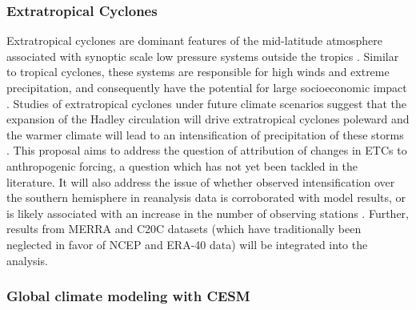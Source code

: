 \documentclass[11pt]{article}
\begin{document}


\subsubsection{Extratropical Cyclones}

Extratropical cyclones are dominant features of the mid-latitude atmosphere associated with synoptic scale low pressure systems outside the tropics \citep{serreze1995climatological}.  Similar to tropical cyclones, these systems are responsible for high winds and extreme precipitation, and consequently have the potential for large socioeconomic impact \citep{ulbrich2009extra}.  Studies of extratropical cyclones under future climate scenarios suggest that the expansion of the Hadley circulation will drive extratropical cyclones poleward \citep{bengtsson2006storm} and the warmer climate will lead to an intensification of precipitation of these storms \citep{bengtsson2009will, zappa2013multi}.  This proposal aims to address the question of attribution of changes in ETCs to anthropogenic forcing, a question which has not yet been tackled in the literature.  It will also address the issue of whether observed intensification over the southern hemisphere in reanalysis data is corroborated with model results, or is likely associated with an increase in the number of observing stations \citep{simmonds2000variability}.  Further, results from MERRA and C20C datasets (which have traditionally been neglected in favor of NCEP and ERA-40 data) will be integrated into the analysis.

\subsubsection{Global climate modeling with CESM}
\end{document}

